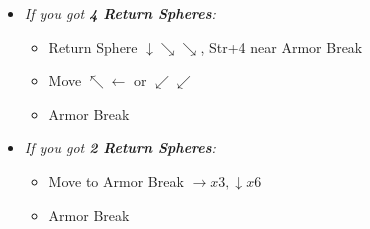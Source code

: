 \begin{spheregrid}
\begin{multicols}{2}
\begin{itemize}
\begin{itemize}
      \end{itemize}
      \tidusf
      \begin{itemize}
      \item \textit{If you got \textbf{4 Return Spheres}:}
      \begin{itemize}
      	\item Return Sphere $\downarrow\searrow\searrow$, Str+4 near Armor Break
                \item Move $\nwarrow\leftarrow$ or $\swarrow\swarrow$
                \item Armor Break
                \end{itemize}
      \item \textit{If you got \textbf{2 Return Spheres}:}
      \begin{itemize}
                \item Move to Armor Break $\rightarrow x3, \downarrow x6$
                \item Armor Break
                \end{itemize}
\end{itemize}
      
    \end{itemize}
  \end{multicols}
\end{spheregrid}
